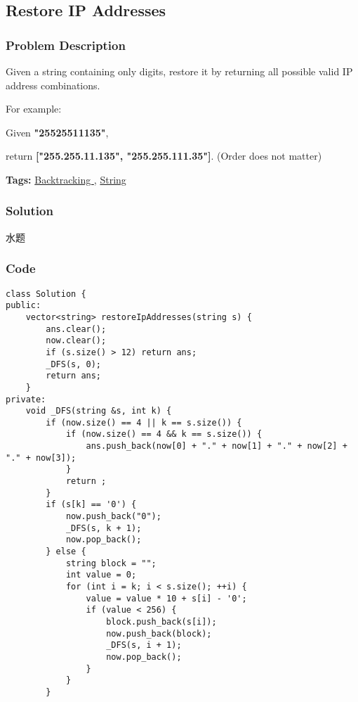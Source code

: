 \documentclass{article}
\begin{document}
\begin{CJK*}{UTF8}{gkai}
\subsection{ Restore IP Addresses }
\label{ Restore IP Addresses }

\subsubsection*{Problem Description}
Given a string containing only digits, restore it by returning all possible valid IP address combinations.

For example:


Given \textbf{"25525511135"},

return \textbf{["255.255.11.135", "255.255.111.35"]}. (Order does not matter)


\textbf{Tags: }
\hyperref[ Backtracking ]{ Backtracking },  \hyperref[ String ]{ String }



\subsubsection*{Solution}
水题

\subsubsection*{Code}
\begin{lstlisting}
class Solution {
public:
    vector<string> restoreIpAddresses(string s) {
        ans.clear();
        now.clear();
        if (s.size() > 12) return ans;
        _DFS(s, 0);
        return ans;
    }
private:
    void _DFS(string &s, int k) {
        if (now.size() == 4 || k == s.size()) {
            if (now.size() == 4 && k == s.size()) {
                ans.push_back(now[0] + "." + now[1] + "." + now[2] + "." + now[3]);
            }
            return ;
        }
        if (s[k] == '0') {
            now.push_back("0");
            _DFS(s, k + 1);
            now.pop_back();
        } else {
            string block = "";
            int value = 0;
            for (int i = k; i < s.size(); ++i) {
                value = value * 10 + s[i] - '0';
                if (value < 256) {
                    block.push_back(s[i]);
                    now.push_back(block);
                    _DFS(s, i + 1);
                    now.pop_back();
                }
            }
        }
        

\end{lstlisting}
\end{CJK*}
\end{document}
